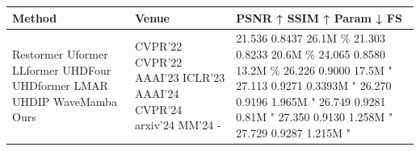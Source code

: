 \begin{tabular}{lll}
\toprule
Method & Venue & PSNR ↑ SSIM ↑ Param ↓ FS \\
\midrule
Restormer Uformer LLformer UHDFour UHDformer LMAR UHDIP WaveMamba Ours & CVPR’22 CVPR’22 AAAI’23 ICLR’23 AAAI’24 CVPR’24 arxiv’24 MM’24 - & 21.536 0.8437 26.1M \% 21.303 0.8233 20.6M \% 24.065 0.8580 13.2M \% 26.226 0.9000 17.5M " 27.113 0.9271 0.3393M " 26.270 0.9196 1.965M " 26.749 0.9281 0.81M " 27.350 0.9130 1.258M " 27.729 0.9287 1.215M " \\
\bottomrule
\end{tabular}

